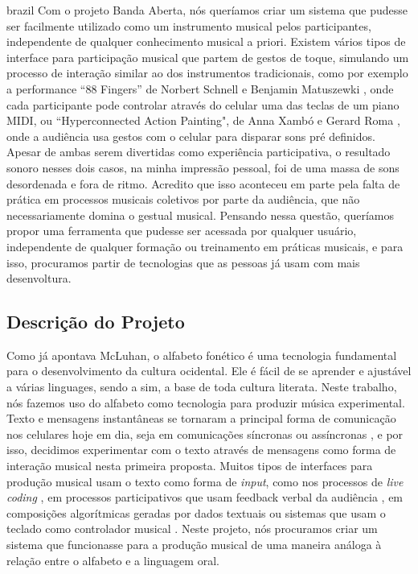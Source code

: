 \begin{otherlanguage*}{brazil}
Com o projeto Banda Aberta, nós queríamos criar um sistema que pudesse ser facilmente utilizado como um instrumento musical pelos participantes, independente de qualquer conhecimento musical a priori. Existem vários tipos de interface para participação musical que partem de gestos de toque, simulando um processo de interação similar ao dos instrumentos tradicionais, como por exemplo a performance ``88 Fingers'' de Norbert Schnell e Benjamin Matuszewki \cite{Schnell2017}, onde cada participante pode controlar através do celular uma das teclas de um piano MIDI, ou ``Hyperconnected Action Painting", de Anna Xambó e Gerard Roma \cite{Xambo2017}, onde a audiência usa gestos com o celular para disparar sons pré definidos. Apesar de ambas serem divertidas como experiência participativa, o resultado sonoro nesses dois casos, na minha impressão pessoal, foi de uma massa de sons desordenada e fora de ritmo. Acredito que isso aconteceu em parte pela falta de prática em processos musicais coletivos por parte da audiência, que não necessariamente domina o gestual musical. Pensando nessa questão, queríamos propor uma ferramenta que pudesse ser acessada por qualquer usuário, independente de qualquer formação ou treinamento em práticas musicais, e para isso, procuramos partir de tecnologias que as pessoas já usam com mais desenvoltura.

\subsection{Descrição do Projeto}
Como já apontava McLuhan\cite{mcluhan1968comunicaccoes}, o alfabeto fonético é uma tecnologia fundamental para o desenvolvimento da cultura ocidental. Ele é fácil de se aprender e ajustável a várias linguages, sendo a sim, a base de toda cultura literata. Neste trabalho, nós fazemos uso do alfabeto como tecnologia para produzir música experimental. Texto e mensagens instantâneas se tornaram a principal forma de comunicação nos celulares hoje em dia, seja em comunicações síncronas ou assíncronas \cite{Madell:2007}, e por isso, decidimos experimentar com  o texto através de mensagens como forma de interação musical nesta primeira proposta. Muitos tipos de interfaces para produção musical usam o texto como forma de \emph{input}, como nos processos de \emph{live coding} \cite{Collins2003}, em processos participativos que usam feedback verbal da audiência \cite{noauthor_transglasphone_nodate}, em composições algorítmicas geradas por dados textuais ou sistemas que usam o teclado como controlador musical \cite{Fiebrink2007}. Neste projeto, nós procuramos criar um sistema que funcionasse para a produção musical de uma maneira análoga à relação entre o alfabeto e a linguagem oral.


\end{otherlanguage*}
